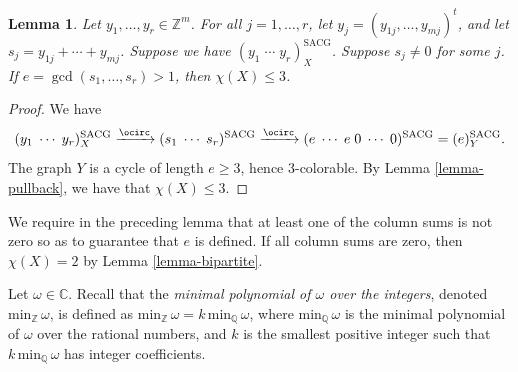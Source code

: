 \documentclass{article}
\newtheorem{Lem}[Thm]{Lemma}
\theoremstyle{definition}
\theoremstyle{remark}
\begin{document}
\begin{Lem}\label{lemma-column-sums-not-coprime}
Let $y_1,\dots,y_r\in \mathbb{Z}^m$.  For all $j=1,\dots,r$, let $y_j=(y_{1j},\dots,y_{mj})^t$, and let $s_j=y_{1j}+\cdots+y_{mj}$.  Suppose we have $(y_1\;\cdots\;y_r)^{\text{SACG}}_X$.  Suppose $s_j\neq 0$ for some $j$.  If $e=\gcd(s_1,\dots,s_r)>1$, then $\chi(X)\leq 3$.\end{Lem}\begin{proof}
We have $$(y_1\;\cdots\;y_r)^{\text{SACG}}_X\xrightarrow{\ocirc}(s_1\;\cdots\;s_r)^{\text{SACG}}\xrightarrow{\ocirc}(e\;\cdots\;e\;0\;\cdots\;0)^{\text{SACG}}=(e)^{\text{SACG}}_Y.$$  
The graph $Y$ is a cycle of length $e\geq 3$, hence $3$-colorable.  By Lemma \ref{lemma-pullback}, we have that $\chi(X)\leq 3$.
\end{proof}

We require in the preceding lemma that at least one of the column sums is not zero so as to guarantee that $e$ is defined.  If all column sums are zero, then $\chi(X)=2$ by Lemma \ref{lemma-bipartite}.


\vspace{.1in}

Let $\omega\in\mathbb{C}$.  Recall that the \emph{minimal polynomial of $\omega$ over the integers}, denoted $\text{min}_\mathbb{Z}\,\omega$, is defined as $\text{min}_\mathbb{Z}\,\omega=k\,\text{min}_\mathbb{Q}\,\omega$, where $\text{min}_\mathbb{Q}\,\omega$ is the minimal polynomial of $\omega$ over the rational numbers, and $k$ is the smallest positive integer such that $k\,\text{min}_\mathbb{Q}\,\omega$ has integer coefficients.
\end{document}
